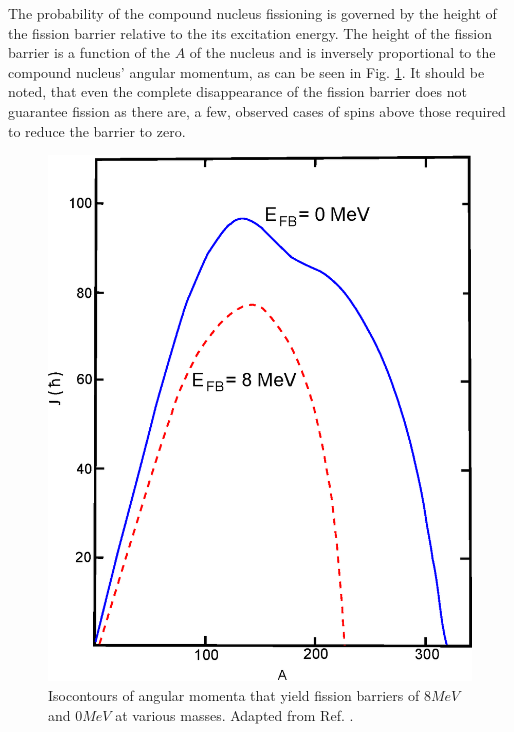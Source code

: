 The probability of the compound nucleus fissioning is governed by the height of the fission barrier relative to the its excitation energy. The height of the fission barrier is a function of the $A$ of the nucleus and is inversely proportional to the compound nucleus' angular momentum, as can be seen in Fig. \ref{fig:chp3-fission-barrier}. It should be noted, that even the complete disappearance of the fission barrier does not guarantee fission as there are, a few, observed cases of spins above those required to reduce the barrier to zero\cite{hyperdef,hyperdef2}.

\begin{figure}[h!]
	\centerline{\includegraphics[height=0.3\textheight]{./img/c3/fission_barrier.eps}}
	\caption{Isocontours of angular momenta that yield fission barriers of $8MeV$ and $0MeV$ at various masses. Adapted from Ref. \cite{fissionBarrier2}.}
	\label{fig:chp3-fission-barrier}
\end{figure}


